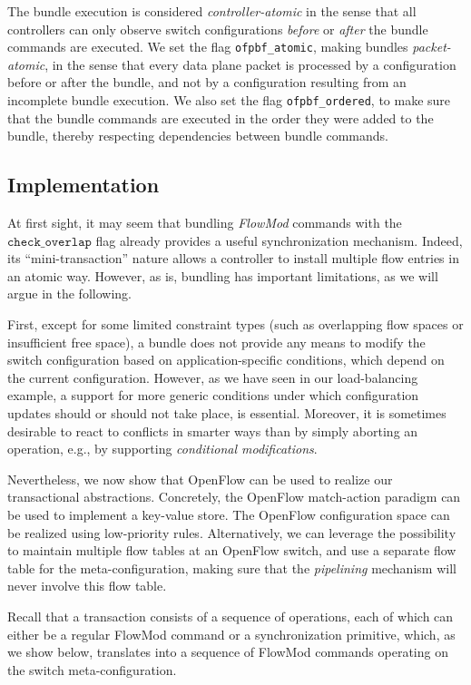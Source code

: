 \documentclass[conference]{sigcomm-alternate}
\newcommand{\checko}{\texttt{check\_overlap}\xspace}
\begin{document}
The bundle execution is considered \emph{controller-atomic}
in the sense that all controllers can only observe switch
configurations \emph{before} or \emph{after} the
bundle commands are executed.
We set the flag \texttt{ofpbf\_atomic},
making bundles \emph{packet-atomic},
in the sense that every data plane packet is processed by a configuration
before or after the bundle, and not by a configuration resulting from
an incomplete bundle execution.
We also set the flag \texttt{ofpbf\_ordered},  to make sure that the
bundle commands are executed in the order they were added to the
bundle, thereby respecting dependencies between bundle commands.

\subsection{Implementation} 

At first sight, it may seem that bundling \emph{FlowMod} commands with  the $\checko$
flag already provides a useful synchronization mechanism.
Indeed, its ``mini-transaction'' nature allows a controller
to install multiple flow entries in an atomic way.
However, as is,
bundling has important limitations, as we will argue in the following.

First, %
except for some limited constraint types (such as
overlapping flow spaces or insufficient free space),
a bundle does not provide any means to modify the switch configuration
based on application-specific conditions, which depend on the
current configuration.
However, as we have seen in our load-balancing
example, a support for more generic conditions under which configuration
updates
should or should not take place, is essential.
Moreover, it is sometimes desirable to react to conflicts in smarter ways than
by simply aborting an operation, e.g., by supporting \emph{conditional modifications}.

Nevertheless, we now show that OpenFlow can be used 
to realize our transactional
abstractions. Concretely, the OpenFlow match-action paradigm can be used
to implement a key-value store.
The OpenFlow
configuration space can be realized using low-priority rules.
Alternatively, we can leverage the possibility to maintain multiple
flow tables at an OpenFlow switch, and use a separate flow table for
the meta-configuration,  making sure that the
\emph{pipelining} mechanism will never involve this
flow table.

Recall that a transaction consists of a sequence of operations,
each of which can either be a regular FlowMod command or a synchronization
primitive, which, as we
show below, translates into a sequence of FlowMod commands operating on the
switch meta-configuration.
\end{document}
